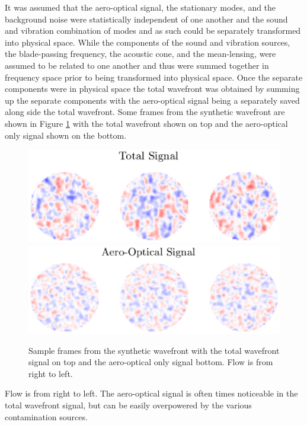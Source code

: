 It was assumed that the aero-optical signal, the stationary modes, and the background noise were statistically independent of one another and the sound and vibration combination of modes and as such could be separately transformed into physical space.
While the components of the sound and vibration sources, the blade-passing frequency, the acoustic cone, and the mean-lensing, were assumed to be related to one another and thus were summed together in frequency space prior to being transformed into physical space.
Once the separate components were in physical space the total wavefront was obtained by summing up the separate components with the aero-optical signal being a separately saved along side the total wavefront.
Some frames from the synthetic wavefront are shown in Figure \ref{fig:04_synthetic_frames} with the total wavefront shown on top and the aero-optical only signal shown on the bottom.
\begin{figure}
 \centering
 \includegraphics{../matlab/04_basic_filtering/synthetic_frames_total.eps}
 \includegraphics{../matlab/04_basic_filtering/synthetic_frames_ao.eps}
 \caption{Sample frames from the synthetic wavefront with the total wavefront signal on top and the aero-optical only signal bottom.  Flow is from right to left.}
 \label{fig:04_synthetic_frames}
\end{figure}
Flow is from right to left.
The aero-optical signal is often times noticeable in the total wavefront signal, but can be easily overpowered by the various contamination sources.

